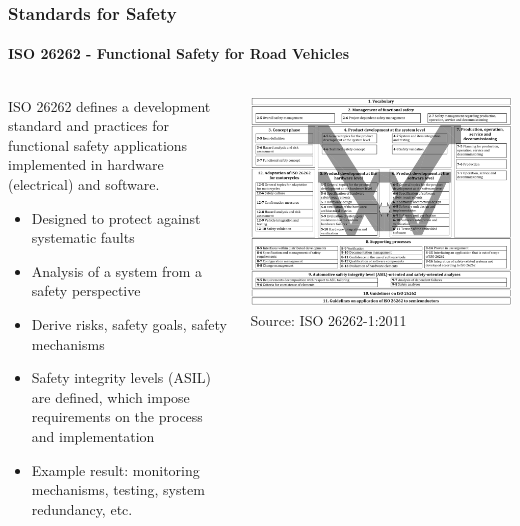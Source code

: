 \begin{frame}
\frametitle{Standards for Safety}
\framesubtitle{ISO 26262 - Functional Safety for Road Vehicles}
\begin{columns}[]
    \begin{column}{0.6\textwidth}
        ISO 26262 defines a development standard and practices for functional safety
        applications implemented in hardware (electrical) and software.\\
        \begin{itemize}
            \item Designed to protect against systematic faults
            \item Analysis of a system from a safety perspective
            \item Derive risks, safety goals, safety mechanisms
            \item Safety integrity levels (ASIL) are defined, which impose
                requirements on the process and implementation
            \item Example result: monitoring mechanisms, testing,
                system redundancy, etc.
        \end{itemize}
    \end{column}
    \begin{column}{0.4\textwidth}
        \centering
        \includegraphics[width=\textwidth]{images/iso26262.png}\\
        \footnotesize Source: ISO 26262-1:2011\footnotemark[1]
    \end{column}
\end{columns}
\end{frame}

